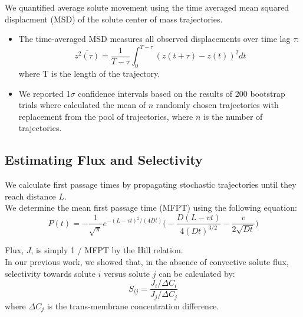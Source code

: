 \documentclass{article}
\begin{document}
  We quantified average solute movement using the time averaged mean squared 
  displacment (MSD) of the solute center of mass trajectories.
  \begin{itemize}
  
 	\item The time-averaged MSD measures all observed displacements over time lag $\tau$:
  	\begin{equation}
  	\overline{z^2(\tau)} = \dfrac{1}{T - \tau}\int_{0}^{T - \tau} (z(t + \tau) - z(t))^2 dt
  	\label{eqn:tamsd}
  	\end{equation}
  	where T is the length of the trajectory.
  	\item We reported 1$\sigma$ confidence intervals based on the results of 200 
  	bootstrap trials where calculated the mean of $n$ randomly chosen trajectories 
  	with replacement from the pool of trajectories, where $n$ is the number of trajectories.
  \end{itemize}

  
  \subsection{Estimating Flux and Selectivity}
  
  \noindent We calculate first passage times by propagating stochastic trajectories until they
  reach distance $L$. \\
  
  We determine the mean first passage time (MFPT) using the following equation:~\cite{cussler_diffusion:_2009}
  \begin{equation}
  P(t) = -\frac{1}{\sqrt{\pi}}e^{-(L - vt)^2 / (4Dt)}\bigg(-\frac{D(L - vt)}{4(Dt)^{3/2}} - \frac{v}{2\sqrt{Dt}}\bigg)
  \label{eqn:passage_times}
  \end{equation}
  
  \noindent Flux, $J$, is simply 1 / MFPT by the Hill relation.~\cite{hill_free_1989} \\
  
  In our previous work, we showed that, in the absence of convective solute flux, selectivity
  towards solute $i$ versus solute $j$ can be calculated by:  
  \begin{equation}
  S_{ij} = \frac{J_i / \Delta C_i}{J_j / \Delta C_j}
  \label{eqn:selectivity}
  \end{equation}
  where $\Delta C_j$ is the trans-membrane concentration difference.
\end{document}
